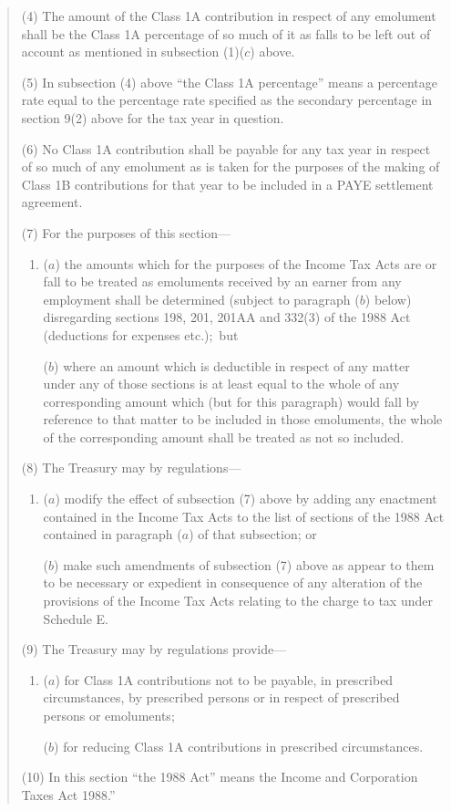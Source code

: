 \documentclass[12pt,a4paper]{article}
\begin{document}
\begin{quotation}
(4) The amount of the Class 1A contribution in respect of any emolument shall be the Class 1A percentage of so much of it as falls to be left out of account as mentioned in subsection (1)($c$)  above.

(5) In subsection (4)  above “the Class 1A percentage” means a percentage rate equal to the percentage rate specified as the secondary percentage in section 9(2)  above for the tax year in question.

(6) No Class 1A contribution shall be payable for any tax year in respect of so much of any emolument as is taken for the purposes of the making of Class 1B contributions for that year to be included in a PAYE settlement agreement.

(7) For the purposes of this section—
\begin{enumerate}\item[]
($a$) the amounts which for the purposes of the Income Tax Acts are or fall to be treated as emoluments received by an earner from any employment shall be determined (subject to paragraph ($b$)  below) disregarding sections 198, 201, 201AA and 332(3)  of the 1988 Act (deductions for expenses etc.);\ but

($b$) where an amount which is deductible in respect of any matter under any of those sections is at least equal to the whole of any corresponding amount which (but for this paragraph) would fall by reference to that matter to be included in those emoluments, the whole of the corresponding amount shall be treated as not so included.
\end{enumerate}

(8) The Treasury may by regulations—
\begin{enumerate}\item[]
($a$) modify the effect of subsection (7)  above by adding any enactment contained in the Income Tax Acts to the list of sections of the 1988 Act contained in paragraph ($a$)  of that subsection; or

($b$) make such amendments of subsection (7)  above as appear to them to be necessary or expedient in consequence of any alteration of the provisions of the Income Tax Acts relating to the charge to tax under Schedule E.
\end{enumerate}

(9) The Treasury may by regulations provide—
\begin{enumerate}\item[]
($a$) for Class 1A contributions not to be payable, in prescribed circumstances, by prescribed persons or in respect of prescribed persons or emoluments;

($b$) for reducing Class 1A contributions in prescribed circumstances.
\end{enumerate}

(10) In this section “the 1988 Act” means the Income and Corporation Taxes Act 1988.”
\end{quotation}
\end{document}
